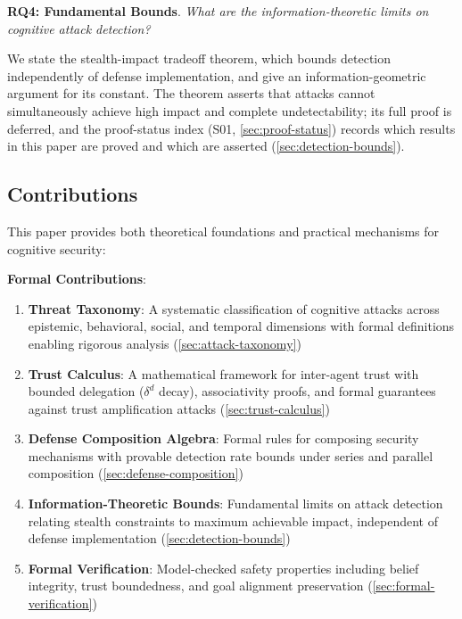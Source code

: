 \documentclass[
]{article}
\begin{document}
\textbf{RQ4: Fundamental Bounds}.
\textit{What are the information-theoretic limits on cognitive attack detection?}

We state the stealth-impact tradeoff theorem, which bounds detection
independently of defense implementation, and give an
information-geometric argument for its constant. The theorem asserts
that attacks cannot simultaneously achieve high impact and complete
undetectability; its full proof is deferred, and the proof-status index
(S01, \cref{sec:proof-status}) records which results in this paper are
proved and which are asserted (\cref{sec:detection-bounds}).

\subsection{Contributions}\label{sec:contributions}

This paper provides both theoretical foundations and practical
mechanisms for cognitive security:

\textbf{Formal Contributions}:

\begin{enumerate}
\item \textbf{Threat Taxonomy}: A systematic classification of cognitive attacks across epistemic, behavioral, social, and temporal dimensions with formal definitions enabling rigorous analysis (\cref{sec:attack-taxonomy})

\item \textbf{Trust Calculus}: A mathematical framework for inter-agent trust with bounded delegation ($\delta^d$ decay), associativity proofs, and formal guarantees against trust amplification attacks (\cref{sec:trust-calculus})

\item \textbf{Defense Composition Algebra}: Formal rules for composing security mechanisms with provable detection rate bounds under series and parallel composition (\cref{sec:defense-composition})

\item \textbf{Information-Theoretic Bounds}: Fundamental limits on attack detection relating stealth constraints to maximum achievable impact, independent of defense implementation (\cref{sec:detection-bounds})

\item \textbf{Formal Verification}: Model-checked safety properties including belief integrity, trust boundedness, and goal alignment preservation (\cref{sec:formal-verification})
\end{enumerate}
\end{document}
